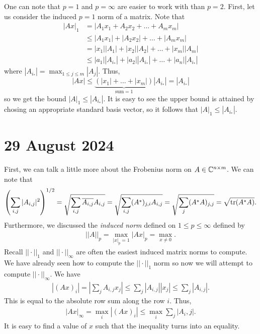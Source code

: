 \documentclass{article}
\begin{document}
One can note that $p = 1$ and $ p = \infty$ are easier to work with than $p = 2$. First, let us consider the induced $p = 1$ norm of a matrix. Note that 
    \begin{align*}
        |Ax|_1 &= |A_1 x_1 + A_2 x_2 + \hdots + A_m x_m | \\
        &\leq |A_1 x_1| +  |A_2 x_2| + \hdots + |A_m x_m| \\
        &= |x_1| |A_1| + |x_2||A_2|+ \hdots + |x_m||A_m| \\
        &\leq |a_1| |A_{i_*}| + |a_2| |A_{i_*}| + \hdots + |a_n| |A_{i_*}|
    \end{align*}
where $|A_{i_*}| = \max_{1 \leq j \leq m} |A_j|$. Thus, 
    \[
        |Ax| \leq \underbrace{(|x_1| + \hdots + |x_m|)}_{\text{sum} = 1} |A_{i_*}| = |A_{i_*}|
    \]
so we get the bound $|A|_1 \leq |A_{i_*}|$. It is easy to see the upper bound is attained by chosing an appropriate standard basis vector, so it follows that $|A|_1 \leq |A_{i_*}|$. 

\section*{29 August 2024}
First, we can talk a little more about the Frobenius norm on $A \in \mathbb{C}^{n \times m}$. We can note that 
    \begin{align*}
        \left(\sum_{i, j} |A_{i,j}|^2 \right)^{1/2} = \sqrt{\sum_{i, j} \overline{A_{i, j}} A_{{i, j}}} = \sqrt{\sum_{i, j}(A^{*})_{j, i}A_{i, j}} = \sqrt{\sum_j(A^* A)_{j, j}} = \sqrt{\tr(A^*A)}.
    \end{align*}
Furthermore, we discussed the \textit{induced norm} defined on $1 \leq p \leq \infty$ defined by 
    \begin{align*}
        ||A||_p = \max_{|x|_p = 1} |Ax|_p = \max_{x \neq 0}.
    \end{align*}
Recall $|| \cdot ||_1$ and $|| \cdot ||_\infty$ are often the easiest induced matrix norms to compute. We have already seen how to compute the $|| \cdot ||_1$ norm so now we will attempt to compute $|| \cdot ||_\infty$. We have
    \begin{align*}
        |(Ax)_i| = |\sum_j A_{i, j} x_j| \leq \sum_j |A_{i, j}| |x_j| \leq \sum_j |A_{i, j}|.
    \end{align*}
This is equal to the absolute row sum along the row $i$. Thus, 
    \begin{align*}
        |Ax|_{\infty} = \max_i|(Ax)_i| \leq \max_i \sum_j |A_i, j|.
    \end{align*}
It is easy to find a value of $x$ such that the inequality turns into an equality.
\newpar
\end{document}
